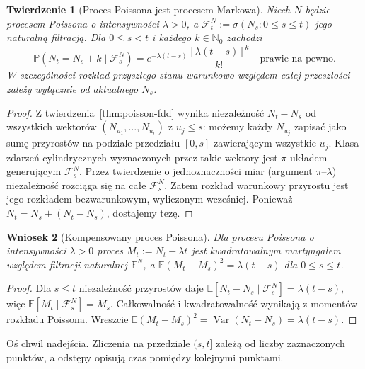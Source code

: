 \documentclass[11pt,a4paper,oneside]{report}
\numberwithin{equation}{chapter}
\theoremstyle{plain}
\newtheorem{twierdzenie}{Twierdzenie}[chapter]
\newtheorem{wniosek}[twierdzenie]{Wniosek}
\theoremstyle{definition}
\theoremstyle{remark}
\newcommand{\N}{\mathbb{N}}
\newcommand{\Prob}{\mathbb{P}}
\newcommand{\E}{\mathbb{E}}
\newcommand{\Var}{\operatorname{Var}}
\newcommand{\calF}{\mathcal{F}}
\begin{document}
\begin{twierdzenie}[Proces Poissona jest procesem Markowa]
Niech $N$ będzie procesem Poissona o intensywności $\lambda>0$,
a $\calF_t^N:=\sigma(N_s:0\le s\le t)$ jego naturalną
filtracją. Dla $0\le s<t$ i każdego $k\in\N_0$ zachodzi
\[
\Prob(N_t=N_s+k\mid\calF_s^N)
=e^{-\lambda(t-s)}\frac{[\lambda(t-s)]^k}{k!}
\quad\text{prawie na pewno}.
\]
W szczególności rozkład przyszłego stanu warunkowo względem
całej przeszłości zależy wyłącznie od aktualnego $N_s$.
\end{twierdzenie}
\begin{proof}
Z twierdzenia~\ref{thm:poisson-fdd} wynika niezależność
$N_t-N_s$ od wszystkich wektorów
$(N_{u_1},\ldots,N_{u_r})$ z $u_j\le s$:
możemy każdy $N_{u_j}$ zapisać jako sumę przyrostów na podziale
przedziału $[0,s]$ zawierającym wszystkie $u_j$.
Klasa zdarzeń cylindrycznych wyznaczonych przez takie wektory
jest $\pi$-układem generującym $\calF_s^N$.
Przez twierdzenie o jednoznaczności miar (argument
$\pi$--$\lambda$) niezależność rozciąga się na całe
$\calF_s^N$. Zatem rozkład warunkowy przyrostu jest jego
rozkładem bezwarunkowym, wyliczonym wcześniej.
Ponieważ $N_t=N_s+(N_t-N_s)$, dostajemy tezę.
\end{proof}

\begin{wniosek}[Kompensowany proces Poissona]
Dla procesu Poissona o intensywności $\lambda>0$ proces
$M_t:=N_t-\lambda t$ jest kwadratowalnym martyngałem względem
filtracji naturalnej $\mathbb F^N$, a
$\E(M_t-M_s)^2=\lambda(t-s)$ dla $0\le s\le t$.
\end{wniosek}
\begin{proof}
Dla $s\le t$ niezależność przyrostów daje
$\E[N_t-N_s\mid\calF_s^N]=\lambda(t-s)$,
więc $\E[M_t\mid\calF_s^N]=M_s$.
Całkowalność i kwadratowalność wynikają z momentów
rozkładu Poissona. Wreszcie
$\E(M_t-M_s)^2=\Var(N_t-N_s)=\lambda(t-s)$.
\end{proof}


\begin{center}
\par\smallskip\small Oś chwil nadejścia. Zliczenia na przedziale $(s,t]$
 zależą od liczby zaznaczonych punktów, a odstępy opisują
 czas pomiędzy kolejnymi punktami.
\end{center}
\end{document}
